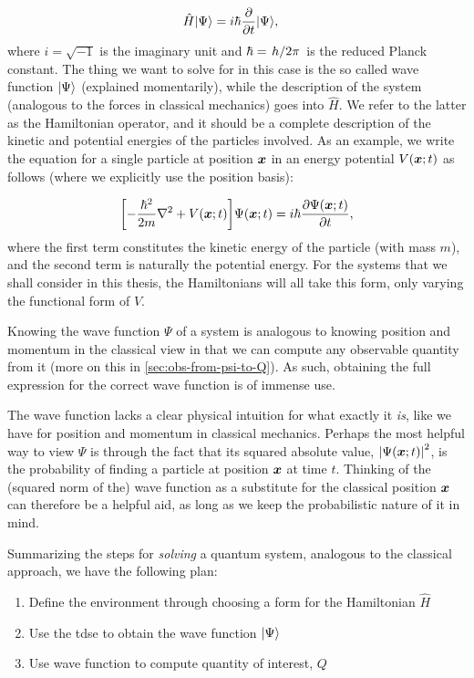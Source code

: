 \documentclass[Thesis.tex]{subfiles}
\begin{document}
\begin{align}
    \hat H| \Psi \rangle &= i\hbar \pdv{}{t}| \Psi \rangle,\label{eq:schrodinger-time-dependent-general}
\end{align}
%
where $i=\sqrt{-1}$ is the imaginary unit and $\hbar=\flatfrac{h}{2\pi}$ is the reduced Planck constant.
The thing we want to solve for in this case is the so called wave function $| \Psi \rangle$
(explained momentarily), while the description of the system (analogous to the forces in
classical mechanics) goes into $\hat H$. We refer to the latter as the Hamiltonian
operator, and it should be a complete description of the kinetic and potential
energies of the particles involved. As an example, we write the equation for a
single particle at position $\bm{x}$ in an energy potential $V(\bm{x}; t)$ as follows
(where we explicitly use the position basis):

\begin{align}
    \qty[-\frac{\hbar^2}{2m} \laplacian + V(\vb x; t)]\Psi(\vb x;t) =
    i\hbar\pdv{\Psi(\vb x; t)}{t},\label{eq:schrodinger-time-dependent-position-basis}
\end{align}
%
where the first term constitutes the kinetic energy of the particle (with mass $m$), and the second term is
naturally the potential energy. For the systems that we shall consider in this thesis, the
Hamiltonians will all take this form, only varying the functional form of $V$.

Knowing the wave function $\Psi$ of a system is analogous to knowing position
and momentum in the classical view in that we can compute any observable
quantity from it (more on this in \cref{sec:obs-from-psi-to-Q}). As such, obtaining the full
expression for the correct wave function is of immense use.

The wave function lacks a clear physical intuition for what exactly it \emph{is},
like we have for position and momentum in classical mechanics. Perhaps the most helpful way to view $\Psi$ is
through the fact that its squared absolute value, $\abs{\Psi(\bm{x}; t)}^2$, is the
probability of finding a particle at position $\bm{x}$ at time $t$. Thinking of the (squared
norm of the) wave function as a substitute for the classical position $\bm{x}$ can
therefore be a helpful aid, as long as we keep the probabilistic nature of it in mind.

Summarizing the steps for \emph{solving} a quantum system, analogous to the
classical approach, we have the following plan:
\begin{enumerate}
    \item Define the environment through choosing a form for the Hamiltonian $\hat H$
    \item Use the \gls{tdse} to obtain the wave function $| \Psi \rangle$
    \item Use wave function to compute quantity of interest, $Q$
\end{enumerate}
\end{document}
